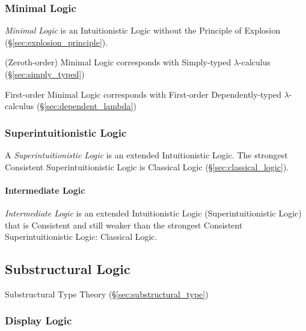 \subsubsection{Minimal Logic}\label{sec:minimal_logic}

\emph{Minimal Logic} is an Intuitionistic Logic without the Principle
of Explosion (\S\ref{sec:explosion_principle}).

(Zeroth-order) Minimal Logic corresponds with Simply-typed
$\lambda$-calculus (\S\ref{sec:simply_typed})

First-order Minimal Logic corresponds with First-order Dependently-typed
$\lambda$-calculus (\S\ref{sec:dependent_lambda})



\subsubsection{Superintuitionistic Logic}
\label{sec:superintuitionistic_logic}

A \emph{Superintuitionistic Logic} is an extended Intuitionistic
Logic. The strongest Consistent Superintuitionistic Logic is Classical
Logic (\S\ref{sec:classical_logic}).



\paragraph{Intermediate Logic}\label{sec:intermediate_logic}\hfill

\emph{Intermediate Logic} is an extended Intuitionistic Logic
(Superintuitionistic Logic) that is Consistent and still weaker than
the strongest Consistent Superintuitionistic Logic: Classical Logic.



\subsection{Substructural Logic}\label{sec:substructural_logic}

Substructural Type Theory (\S\ref{sec:substructural_type})



\subsubsection{Display Logic}\label{sec:display_logic}

